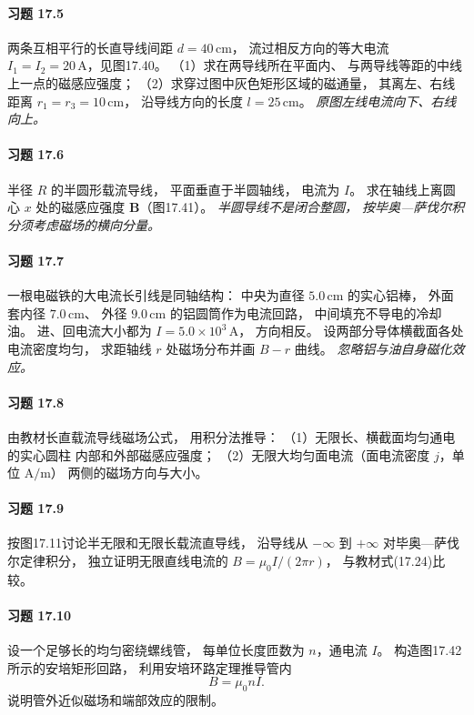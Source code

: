 \paragraph{习题 17.5}
两条互相平行的长直导线间距
\(d=40\,\mathrm{cm}\)，
流过相反方向的等大电流
\(I_1=I_2=20\,\mathrm A\)，见图17.40。
（1）求在两导线所在平面内、
与两导线等距的中线上一点的磁感应强度；
（2）求穿过图中灰色矩形区域的磁通量，
其离左、右线距离
\(r_1=r_3=10\,\mathrm{cm}\)，
沿导线方向的长度
\(l=25\,\mathrm{cm}\)。
\textit{原图左线电流向下、右线向上。}

\paragraph{习题 17.6}
半径 \(R\) 的半圆形载流导线，
平面垂直于半圆轴线，
电流为 \(I\)。
求在轴线上离圆心
\(x\) 处的磁感应强度
\(\boldsymbol B\)（图17.41）。
\textit{半圆导线不是闭合整圆，
按毕奥—萨伐尔积分须考虑磁场的横向分量。}

\paragraph{习题 17.7}
一根电磁铁的大电流长引线是同轴结构：
中央为直径
\(5.0\,\mathrm{cm}\) 的实心铝棒，
外面套内径 \(7.0\,\mathrm{cm}\)、
外径 \(9.0\,\mathrm{cm}\) 的铝圆筒作为电流回路，
中间填充不导电的冷却油。
进、回电流大小都为
\(I=5.0\times10^3\,\mathrm A\)，
方向相反。
设两部分导体横截面各处电流密度均匀，
求距轴线 \(r\) 处磁场分布并画 \(B-r\) 曲线。
\textit{忽略铝与油自身磁化效应。}

\paragraph{习题 17.8}
由教材长直载流导线磁场公式，
用积分法推导：
（1）无限长、横截面均匀通电的实心圆柱
内部和外部磁感应强度；
（2）无限大均匀面电流（面电流密度
\(j\)，单位 \(\mathrm{A/m}\)）
两侧的磁场方向与大小。

\paragraph{习题 17.9}
按图17.11讨论半无限和无限长载流直导线，
沿导线从 \(-\infty\) 到 \(+\infty\)
对毕奥—萨伐尔定律积分，
独立证明无限直线电流的
\(B=\mu_0I/(2\pi r)\)，
与教材式(17.24)比较。

\paragraph{习题 17.10}
设一个足够长的均匀密绕螺线管，
每单位长度匝数为 \(n\)，通电流 \(I\)。
构造图17.42所示的安培矩形回路，
利用安培环路定理推导管内
\[
 B=\mu_0nI.
\]
说明管外近似磁场和端部效应的限制。


